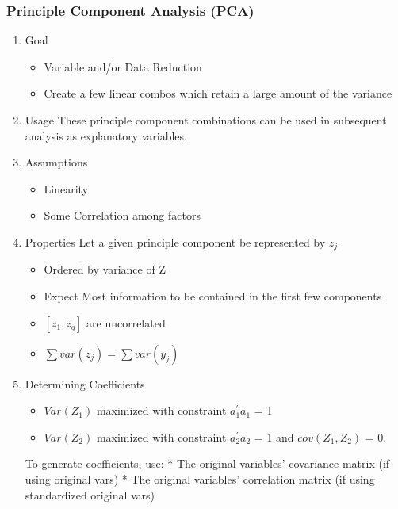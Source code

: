 \documentclass[11pt]{article}
\begin{document}
\subsubsection{Principle Component Analysis (PCA)}
\label{sec:orgde1af73}
\begin{enumerate}
\item Goal
\label{sec:orgd8f213c}
\begin{itemize}
\item Variable and/or Data Reduction
\item Create a few linear combos which retain a large amount of the
variance
\end{itemize}

\item Usage
\label{sec:org3f0e7a1}
These principle component combinations can be used in subsequent
analysis as explanatory variables.

\item Assumptions
\label{sec:orgd9b9aca}
\begin{itemize}
\item Linearity
\item Some Correlation among factors
\end{itemize}

\item Properties
\label{sec:org33b9b90}
Let a given principle component be represented by \(z_j\)

\begin{itemize}
\item Ordered by variance of Z
\item Expect Most information to be contained in the first few components
\item \([z_1, z_q]\) are uncorrelated
\item \(\sum var(z_j) = \sum var(y_j)\)
\end{itemize}

\item Determining Coefficients
\label{sec:org1b08beb}
\begin{itemize}
\item \(Var(Z_1)\) maximized with constraint \(a_1^{\prime}a_1\) = 1
\item \(Var(Z_2)\) maximized with constraint \(a_2^{\prime}a_2\) = 1 and
\(cov(Z_1, Z_2)\) = 0.
\end{itemize}

To generate coefficients, use: * The original variables' covariance
matrix (if using original vars) * The original variables' correlation
matrix (if using standardized original vars)


\end{enumerate}
\end{document}
